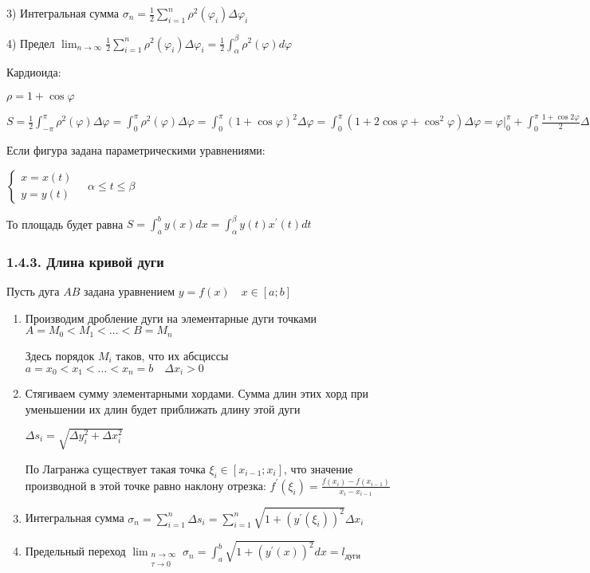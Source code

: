 \documentclass[12pt]{article}
\begin{document}
    3) Интегральная сумма $\sigma_n = \frac{1}{2} \sum_{i=1}^n \rho^2 (\varphi_i) \Delta \varphi_i$

    4) Предел $\lim_{n \to \infty} \frac{1}{2} \sum_{i=1}^n \rho^2 (\varphi_i) \Delta \varphi_i = \frac{1}{2} \int_\alpha^\beta \rho^2(\varphi) d\varphi$

    \Ex Кардиоида:

    $\rho = 1 + \cos\varphi$

    $S = \frac{1}{2}\int^{\pi}_{-\pi} \rho^2 (\varphi) \Delta \varphi = \int_0^\pi \rho^2 (\varphi) \Delta \varphi =
    \int_0^\pi (1 + \cos\varphi)^2 \Delta \varphi = \int_0^\pi (1 + 2\cos\varphi + \cos^2\varphi) \Delta \varphi =
    \varphi \Big|_0^\pi + \int_0^\pi \frac{1 + \cos2\varphi}{2} \Delta \varphi = \pi + \frac{1}{2}\pi = \frac{3}{2}\pi$

    \Nota Если фигура задана параметрическими уравнениями:

    $\begin{cases}x = x(t) \\ y = y(t)\end{cases} \quad \alpha \leq t \leq \beta$

    То площадь будет равна $S = \int_a^b y(x)dx = \int^\beta_\alpha y(t)x^\prime(t)dt$

    \subsubsection{1.4.3. Длина кривой дуги}

    \hypertarget{lengthofarc}{Пусть дуга $AB$ задана уравнением $y = f(x) \quad x \in [a;b]$}

    \begin{enumerate}
        \item Производим дробление дуги на элементарные дуги точками $A = M_0 < M_1 < \dots < B = M_n$

        Здесь порядок $M_i$ таков, что их абсциссы $a = x_0 < x_1 < \dots < x_n = b \quad \Delta x_i > 0$

        \item Стягиваем сумму элементарными хордами. Сумма длин этих хорд при уменьшении их длин будет приближать длину этой дуги

        $\Delta s_i = \sqrt{\Delta y^2_i + \Delta x_i^2}$

        По \Ths Лагранжа существует такая точка $\xi_i \in [x_{i-1};x_i]$,
        что значение производной в этой точке равно наклону отрезка: $f^\prime(\xi_i) = \frac{f(x_i) - f(x_{i-1})}{x_i - x_{i-1}}$

        \item Интегральная сумма $\sigma_n = \sum_{i=1}^n \Delta s_i = \sum_{i=1}^n \sqrt{1 + (y^\prime(\xi_i))^2} \Delta x_i$

        \item Предельный переход $\lim_{\substack{n\to\infty \\ \tau \to 0}} \sigma_n = \int_a^b \sqrt{1 + (y^\prime(x))^2} dx = l_\text{дуги}$
    \end{enumerate}
\end{document}
